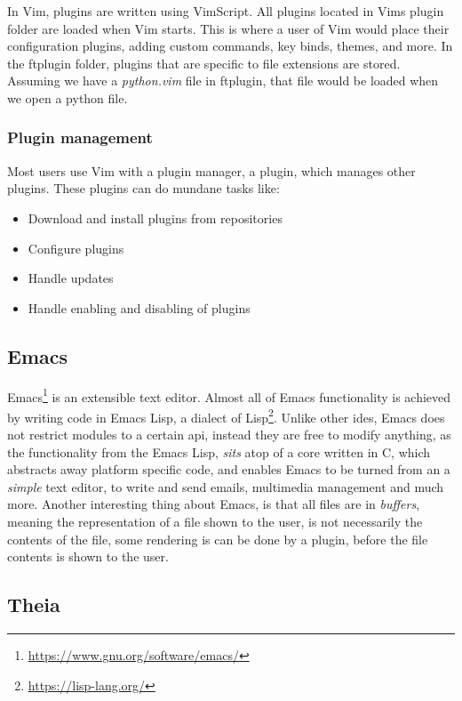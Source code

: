 In Vim, plugins are written using VimScript. All plugins located in Vims plugin
folder are loaded when Vim starts. This is where a user of Vim would place their
configuration plugins, adding custom commands, key binds, themes, and more. In
the ftplugin folder, plugins that are specific to file extensions are stored.
Assuming we have a \textit{python.vim} file in ftplugin, that file would be
loaded when we open a python file.


\subsubsection{Plugin management}

Most users use Vim with a plugin manager, a plugin, which manages other plugins.
These plugins can do mundane tasks like:

\begin{itemize}
  \item Download and install plugins from repositories
  \item Configure plugins
  \item Handle updates
  \item Handle enabling and disabling of plugins
\end{itemize}


\subsection{Emacs}

Emacs\footnote{\url{https://www.gnu.org/software/emacs/}} is an extensible text
editor. Almost all of Emacs functionality is achieved by writing code in Emacs
Lisp, a dialect of Lisp\footnote{\url{https://lisp-lang.org/}}. Unlike other
\gls*{ide}s, Emacs does not restrict modules to a certain \gls*{api}, instead
they are free to modify anything, as the functionality from the Emacs Lisp,
\textit{sits} atop of a core written in C, which abstracts away platform
specific code, and enables Emacs to be turned from an a \textit{simple} text
editor, to write and send emails, multimedia management and much more. Another
interesting thing about Emacs, is that all files are in \textit{buffers},
meaning the representation of a file shown to the user, is not necessarily the
contents of the file, some rendering is can be done by a plugin, before the file
contents is shown to the user.


\subsection{Theia}

